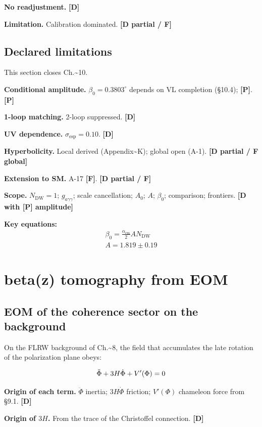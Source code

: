 ﻿\documentclass[11pt,letterpaper]{article}
\begin{document}
\textbf{No readjustment.} \textbf{[D]}

\textbf{Limitation.} Calibration dominated. \textbf{[D partial / F]}
\subsection{Declared limitations}
This section closes Ch.\textasciitilde{}10.

\textbf{Conditional amplitude.} $\beta_0 = 0{.}3803^\circ$ depends on VL completion (§10.4); \textbf{[P]}. \textbf{[P]}

\textbf{1-loop matching.} 2-loop suppressed. \textbf{[D]}

\textbf{UV dependence.} $\sigma_{\text{esp}} = 0{.}10$. \textbf{[D]}

\textbf{Hyperbolicity.} Local derived (Appendix\textasciitilde{}K); global open (A-1). \textbf{[D partial / F global]}

\textbf{Extension to SM.} A-17 \textbf{[F]}. \textbf{[D partial / F]}

\textbf{Scope.} $N_{\text{DW}} = 1$; $g_{a\gamma\gamma}$; scale cancellation; $A_0$; $A$; $\beta_0$; comparison; frontiers. \textbf{[D with [P] amplitude]}

\textbf{Key equations:}
\begin{align*}
    \beta_0 = \frac{\alpha_{\mathrm{em}}}{2} A N_{\mathrm{DW}} \\
    A = 1.819 \pm 0.19
\end{align*}
\section{beta(z) tomography from EOM}
\subsection{EOM of the coherence sector on the background}
On the FLRW background of Ch.\textasciitilde{}8, the field that accumulates the late rotation of the polarization plane obeys:

\begin{equation*}
  \resizebox{\ifdim\width>\linewidth \linewidth\else\width\fi}{!}{$\displaystyle \ddot\Phi + 3H\dot\Phi + V'(\Phi) = 0$}
\end{equation*}

\textbf{Origin of each term.} $\ddot\Phi$ inertia; $3H\dot\Phi$ friction; $V'(\Phi)$ chameleon force from §9.1. \textbf{[D]}

\textbf{Origin of $3H$.} From the trace of the Christoffel connection. \textbf{[D]}
\end{document}
